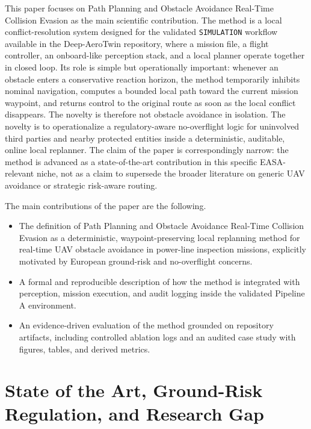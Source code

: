 \documentclass[a4paper,11pt]{article}
\begin{document}
This paper focuses on Path Planning and Obstacle Avoidance Real-Time Collision Evasion as the main scientific contribution. The method is a local conflict-resolution system designed for the validated \texttt{SIMULATION} workflow available in the Deep-AeroTwin repository, where a mission file, a flight controller, an onboard-like perception stack, and a local planner operate together in closed loop. Its role is simple but operationally important: whenever an obstacle enters a conservative reaction horizon, the method temporarily inhibits nominal navigation, computes a bounded local path toward the current mission waypoint, and returns control to the original route as soon as the local conflict disappears. The novelty is therefore not obstacle avoidance in isolation. The novelty is to operationalize a regulatory-aware no-overflight logic for uninvolved third parties and nearby protected entities inside a deterministic, auditable, online local replanner. The claim of the paper is correspondingly narrow: the method is advanced as a state-of-the-art contribution in this specific EASA-relevant niche, not as a claim to supersede the broader literature on generic UAV avoidance or strategic risk-aware routing.

The main contributions of the paper are the following.
\begin{itemize}[leftmargin=1.3em]
    \item The definition of Path Planning and Obstacle Avoidance Real-Time Collision Evasion as a deterministic, waypoint-preserving local replanning method for real-time UAV obstacle avoidance in power-line inspection missions, explicitly motivated by European ground-risk and no-overflight concerns.
    \item A formal and reproducible description of how the method is integrated with perception, mission execution, and audit logging inside the validated Pipeline A environment.
    \item An evidence-driven evaluation of the method grounded on repository artifacts, including controlled ablation logs and an audited case study with figures, tables, and derived metrics.
\end{itemize}

\section{State of the Art, Ground-Risk Regulation, and Research Gap}
\end{document}
